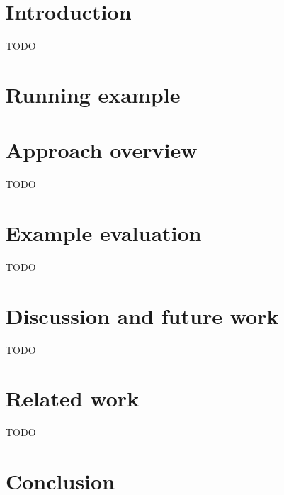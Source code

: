 \documentclass[sigconf]{acmart}
\theoremstyle{remark}
\begin{document}


\maketitle

\thispagestyle{empty}

\section{Introduction}
TODO

\section{Running example}


\section{Approach overview}
TODO

\section{Example evaluation}
TODO

\section{Discussion and future work}
TODO

\section{Related work}
TODO

\section{Conclusion}




\end{document}
